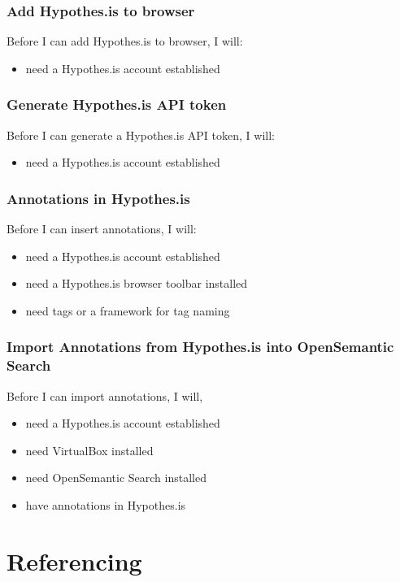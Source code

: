 \documentclass{article}
\begin{document}
\subsubsection*{Add Hypothes.is to browser}

Before I can add Hypothes.is to browser, I will:
\begin{itemize}
\item need a Hypothes.is account established
\end{itemize}

\subsubsection*{Generate Hypothes.is API token}

Before I can generate a Hypothes.is API token, I will:
\begin{itemize}
\item need a Hypothes.is account established
\end{itemize}

\subsubsection*{Annotations in Hypothes.is}

Before I can insert annotations, I will:
\begin{itemize}
\item need a Hypothes.is account established
\item need a Hypothes.is browser toolbar installed
\item need tags or a framework for tag naming
\end{itemize}

\subsubsection*{Import Annotations from Hypothes.is into OpenSemantic Search}

Before I can import annotations, I will, 
\begin{itemize}
\item need a Hypothes.is account established
\item need VirtualBox installed
\item need OpenSemantic Search installed
\item have annotations in Hypothes.is
\end{itemize}

\section*{Referencing}
\end{document}
